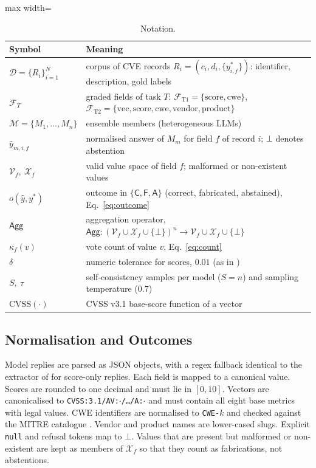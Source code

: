 \documentclass[11pt]{article}
\begin{document}
\begin{table}[htbp]\centering\small
\caption{Notation.}\label{tab:notation}
\begin{adjustbox}{max width=\textwidth}\begin{tabular}{@{}ll@{}}
\toprule
Symbol & Meaning \\ \midrule
$\mathcal{D}=\{R_i\}_{i=1}^{N}$ & corpus of CVE records $R_i=(c_i,d_i,\{y^*_{i,f}\})$: identifier, description, gold labels \\
$\mathcal{F}_{T}$ & graded fields of task $T$: $\mathcal{F}_{\mathrm{T1}}=\{\text{score},\text{cwe}\}$, $\mathcal{F}_{\mathrm{T2}}=\{\text{vec},\text{score},\text{cwe},\text{vendor},\text{product}\}$ \\
$\mathcal{M}=\{M_1,\dots,M_n\}$ & ensemble members (heterogeneous LLMs) \\
$\hat y_{m,i,f}$ & normalised answer of $M_m$ for field $f$ of record $i$; $\bot$ denotes abstention \\
$\mathcal{V}_f,\ \mathcal{X}_f$ & valid value space of field $f$; malformed or non-existent values \\
$o(\hat y,y^*)$ & outcome in $\{\mathsf{C},\mathsf{F},\mathsf{A}\}$ (correct, fabricated, abstained), Eq.~\eqref{eq:outcome} \\
$\mathsf{Agg}$ & aggregation operator, $\mathsf{Agg}:(\mathcal{V}_f\cup\mathcal{X}_f\cup\{\bot\})^n\to\mathcal{V}_f\cup\mathcal{X}_f\cup\{\bot\}$ \\
$\kappa_f(v)$ & vote count of value $v$, Eq.~\eqref{eq:count} \\
$\delta$ & numeric tolerance for scores, $0.01$ (as in \citealp{anon2026grounding}) \\
$S,\ \tau$ & self-consistency samples per model ($S{=}n$) and sampling temperature ($0.7$) \\
$\mathrm{CVSS}(\cdot)$ & CVSS v3.1 base-score function of a vector \citep{first2019cvss} \\
\bottomrule
\end{tabular}\end{adjustbox}
\end{table}

\subsection{Normalisation and Outcomes}
Model replies are parsed as JSON objects, with a regex fallback identical to the extractor of \citet{anon2026grounding} for score-only replies. Each field is mapped to a canonical value. Scores are rounded to one decimal and must lie in $[0,10]$. Vectors are canonicalised to \texttt{CVSS:3.1/AV:$\cdot$/\dots/A:$\cdot$} and must contain all eight base metrics with legal values. CWE identifiers are normalised to \texttt{CWE-}$k$ and checked against the MITRE catalogue \citep{mitre2024cwe}. Vendor and product names are lower-cased slugs. Explicit \texttt{null} and refusal tokens map to $\bot$. Values that are present but malformed or non-existent are kept as members of $\mathcal{X}_f$ so that they count as fabrications, not abstentions.
\end{document}

